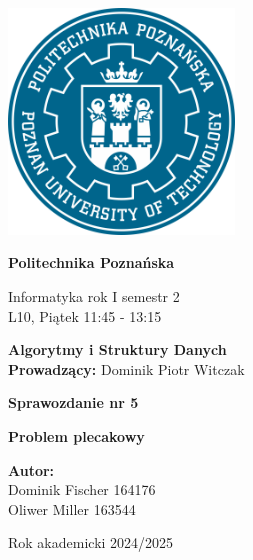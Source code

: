\documentclass{article}
\begin{document}
	
	
	\thispagestyle{empty} %
	
	\begin{center}
		\includegraphics[width=6cm]{Image/PP-PUT-LOGO.png}
		\vspace{1cm}
		
		{\Huge\bfseries Politechnika Poznańska}
		
		\vspace{1cm}
		
		{\large Informatyka rok I semestr 2} \\[0.3cm]
		L10, Piątek 11:45 - 13:15
		
		\vspace{1.5cm}
		
		{\LARGE\bfseries Algorytmy i Struktury Danych} \\[0.3cm]
		\textbf{Prowadzący:} Dominik Piotr Witczak
		
		\vspace{2cm}
		
		{\LARGE\bfseries Sprawozdanie nr 5} 
		
		\vspace{1cm}
		
		{\Large\bfseries Problem plecakowy}
		
		\vspace{3cm}
		
		\begin{flushright}
			\textbf{Autor:} \\[0.2cm]
			Dominik Fischer 164176 \\
			Oliwer Miller 163544
		\end{flushright}
		
		\vspace{1.5cm}
		Rok akademicki 2024/2025
	\end{center}
	
\end{document}
